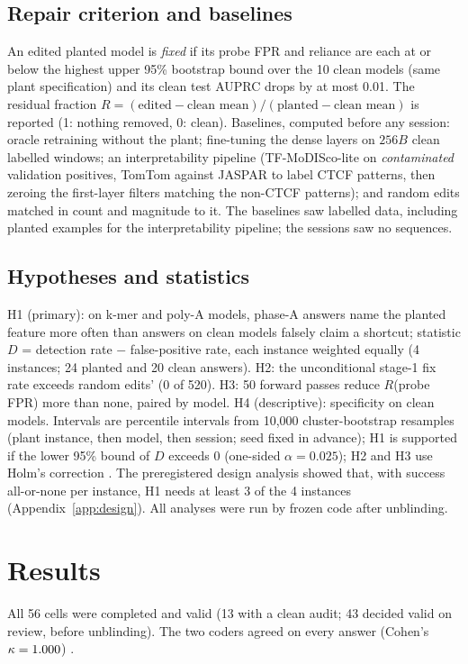 \documentclass[11pt]{article}
\begin{document}
\subsection{Repair criterion and baselines}
An edited planted model is \emph{fixed} if its probe FPR and reliance are each at or below the highest upper 95\%
bootstrap bound over the 10 clean models (same plant specification) and its clean test AUPRC drops by at most 0.01.
The residual fraction $R = (\text{edited} - \text{clean mean})/(\text{planted} - \text{clean mean})$ is reported
(1: nothing removed, 0: clean). Baselines, computed before any session: oracle retraining without the plant;
fine-tuning the dense layers on $256B$ clean labelled windows; an interpretability pipeline (TF-MoDISco-lite \citep{modiscolite} on
\emph{contaminated} validation positives, TomTom against JASPAR to label CTCF patterns, then zeroing the first-layer
filters matching the non-CTCF patterns); and random edits matched in
count and magnitude to it. The baselines saw labelled data, including planted examples for the interpretability
pipeline; the sessions saw no sequences.

\subsection{Hypotheses and statistics}
H1 (primary): on k-mer and poly-A models, phase-A answers name the planted feature more often than answers on clean
models falsely claim a shortcut; statistic $D$ = detection rate $-$ false-positive rate, each instance weighted
equally (4 instances; 24 planted and 20 clean answers). H2: the unconditional stage-1 fix rate exceeds random edits'
(0 of 520). H3: 50 forward passes reduce $R$(probe FPR) more than none, paired by model. H4 (descriptive):
specificity on clean models. Intervals are percentile intervals from 10,000 cluster-bootstrap resamples (plant
instance, then model, then session; seed fixed in advance); H1 is supported if the lower 95\% bound of $D$ exceeds 0
(one-sided $\alpha = 0.025$); H2 and H3 use Holm's correction \citep{holm1979}. The preregistered design analysis showed that, with
success all-or-none per instance, H1 needs at least 3 of the 4 instances (Appendix~\ref{app:design}). All analyses
were run by frozen code after unblinding.

\section{Results}
All 56 cells were completed and valid (13 with a clean audit; 43 decided valid on review, before unblinding). The
two coders agreed on every answer (Cohen's $\kappa = 1.000$) \citep{cohen1960}.
\end{document}
